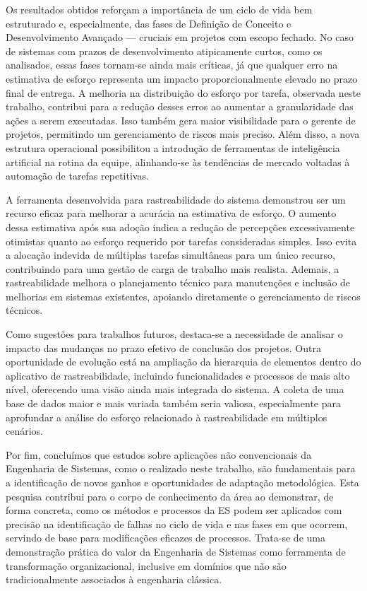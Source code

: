 Os resultados obtidos reforçam a importância de um ciclo de vida bem estruturado e, especialmente, das fases de Definição de Conceito e Desenvolvimento Avançado — cruciais em projetos
com escopo fechado. No caso de sistemas com prazos de desenvolvimento atipicamente curtos, como os analisados, essas fases tornam-se ainda mais críticas, já que qualquer erro na
estimativa de esforço representa um impacto proporcionalmente elevado no prazo final de entrega. A melhoria na distribuição do esforço por tarefa, observada neste trabalho, contribui
para a redução desses erros ao aumentar a granularidade das ações a serem executadas. Isso também gera maior visibilidade para o gerente de projetos, permitindo um gerenciamento de
riscos mais preciso. Além disso, a nova estrutura operacional possibilitou a introdução de ferramentas de inteligência artificial na rotina da equipe, alinhando-se às tendências de
mercado voltadas à automação de tarefas repetitivas.

A ferramenta desenvolvida para rastreabilidade do sistema demonstrou ser um recurso eficaz para melhorar a acurácia na estimativa de esforço. O aumento dessa estimativa após sua adoção
indica a redução de percepções excessivamente otimistas quanto ao esforço requerido por tarefas consideradas simples. Isso evita a alocação indevida de múltiplas tarefas simultâneas
para um único recurso, contribuindo para uma gestão de carga de trabalho mais realista. Ademais, a rastreabilidade melhora o planejamento técnico para manutenções e inclusão de
melhorias em sistemas existentes, apoiando diretamente o gerenciamento de riscos técnicos.

Como sugestões para trabalhos futuros, destaca-se a necessidade de analisar o impacto das mudanças no prazo efetivo de conclusão dos projetos. Outra oportunidade de evolução está na
ampliação da hierarquia de elementos dentro do aplicativo de rastreabilidade, incluindo funcionalidades e processos de mais alto nível, oferecendo uma visão ainda mais integrada do
sistema. A coleta de uma base de dados maior e mais variada também seria valiosa, especialmente para aprofundar a análise do esforço relacionado à rastreabilidade em múltiplos cenários.

Por fim, concluímos que estudos sobre aplicações não convencionais da Engenharia de Sistemas, como o realizado neste trabalho, são fundamentais para a identificação de novos ganhos e
oportunidades de adaptação metodológica. Esta pesquisa contribui para o corpo de conhecimento da área ao demonstrar, de forma concreta, como os métodos e processos da ES podem ser
aplicados com precisão na identificação de falhas no ciclo de vida e nas fases em que ocorrem, servindo de base para modificações eficazes de processos. Trata-se de uma demonstração
prática do valor da Engenharia de Sistemas como ferramenta de transformação organizacional, inclusive em domínios que não são tradicionalmente associados à engenharia clássica.

